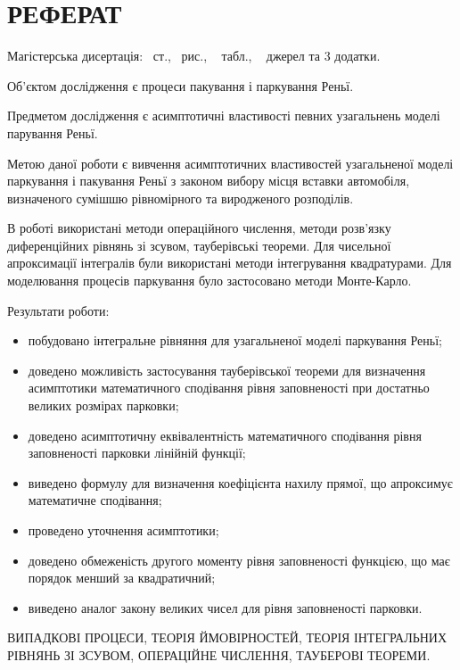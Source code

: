 \chapter*{РЕФЕРАТ}

Магістерська дисертація: \pageref*{MyLastPage}~ст., \totfig~рис., \tottab~ табл., ~ джерел та 3 додатки.

Об'єктом дослідження є процеси пакування і паркування Реньї.

Предметом дослідження є асимптотичні властивості певних узагальнень моделі парування Реньї.

Метою даної роботи є вивчення асимптотичних властивостей узагальненої моделі паркування і пакування Реньї з законом вибору місця вставки автомобіля, визначеного сумішшю рівномірного та виродженого розподілів.

В роботі використані методи операційного числення, методи розв'язку диференційних рівнянь зі зсувом, тауберівські теореми. Для чисельної апроксимації інтегралів були використані методи інтегрування квадратурами. Для моделювання процесів паркування було застосовано методи Монте-Карло.

Результати роботи:
\begin{itemize}
	\item побудовано інтегральне рівняння для узагальненої моделі паркування Реньї;
	\item доведено можливість застосування тауберівської теореми для визначення асимптотики математичного сподівання рівня заповненості при достатньо великих розмірах парковки;
	\item доведено асимптотичну еквівалентність математичного сподівання рівня заповненості парковки лінійній функції;
	\item виведено формулу для визначення коефіцієнта нахилу прямої, що апроксимує математичне сподівання;
	\item проведено уточнення асимптотики;
	\item доведено обмеженість другого моменту рівня заповненості функцією, що має порядок менший за квадратичний;
	\item виведено аналог закону великих чисел для рівня заповненості парковки.
\end{itemize}

\MakeUppercase{випадкові процеси, теорія ймовірностей, теорія інтегральних рівнянь зі зсувом, операційне числення, тауберові теореми.} 
